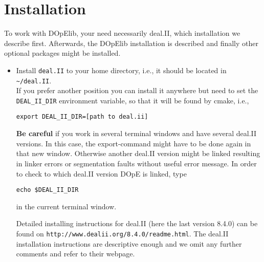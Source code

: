 \section{Installation}\label{sec_installation}
To work with DOpElib, your need necessarily deal.II, which installation 
we describe first. Afterwards, the DOpElib installation is described and finally
other optional packages might be installed.
\begin{itemize}
\item Install \texttt{deal.II} to your home directory, i.e., it should be located in \\
\texttt{\textasciitilde/deal.II}. \\[1mm]
If you prefer another position you can install it anywhere but need 
to set the \texttt{DEAL\_II\_DIR} environment variable, so that it 
will be found by cmake, i.e.,
\begin{lstlisting}
export DEAL_II_DIR=[path to deal.ii]
\end{lstlisting}
\begin{remark}
\textbf{Be careful} if you work in several terminal windows and have several deal.II versions. In this case, the
export-command might have to be done again in that new window. Otherwise
another deal.II version might be linked resulting in linker errors or
segmentation faults without useful error message. In order to check to which
deal.II version DOpE is linked, type 
\begin{lstlisting}
echo $DEAL_II_DIR
\end{lstlisting}
in the current terminal window.
\end{remark}
Detailed installing instructions for deal.II (here the last version
8.4.0) can be found on 
\texttt{http://www.dealii.org/8.4.0/readme.html}. The deal.II 
installation instructions are descriptive enough and we omit 
any further comments and refer to their webpage.
%


\end{itemize}
